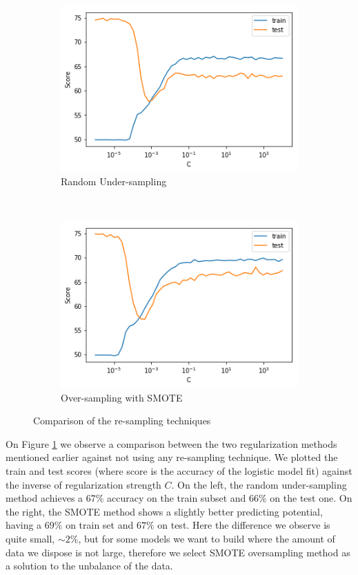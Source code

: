 \begin{figure}[h]
    \begin{subfigure}{0.5\textwidth}
        \centering
        \caption{Random Under-sampling}
        \includegraphics[width=1\textwidth]{Figures/undersampling.png}
    \end{subfigure}%
    ~ 
    \begin{subfigure}{0.5\textwidth}
        \centering
        \caption{Over-sampling with SMOTE}
        \includegraphics[width=1\textwidth]{Figures/oversampling.png}
    \end{subfigure}
    \caption{Comparison of the re-sampling techniques}
    \label{smote}
\end{figure}

On Figure \ref{smote} we observe a comparison between the two regularization methods mentioned earlier against not using any re-sampling technique. We plotted the train and test scores (where score is the accuracy of the logistic model fit) against the inverse of regularization strength $C$. On the left, the random under-sampling method achieves a $67\%$ accuracy on the train subset and $66\%$ on the test one. On the right, the SMOTE method shows a slightly better predicting potential, having a $69\%$ on train set and $67\%$ on test. Here the difference we observe is quite small, $\sim 2\%$, but for some models we want to build where the amount of data we dispose is not large, therefore we select SMOTE oversampling method as a solution to the unbalance of the data.

